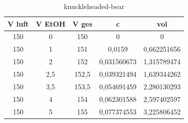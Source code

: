 \begin{table}[htbp]
    \centering
    \caption{knuckleheaded-bear}
    \label{tab:excel}
    \begin{tabular}{ccccc}
        \toprule
        {V luft} & {V EtOH} & {V ges} & {c} & {vol} \\
        \midrule
        150 & 0   & 150   & 0           & 0           \\
        150 & 1   & 151   & 0,0159      & 0,662251656 \\
        150 & 2   & 152   & 0,031560673 & 1,315789474 \\
        150 & 2,5 & 152,5 & 0,039321494 & 1,639344262 \\
        150 & 3,5 & 153,5 & 0,054691459 & 2,280130293 \\
        150 & 4   & 154   & 0,062301588 & 2,597402597 \\
        150 & 5   & 155   & 0,077374553 & 3,225806452 \\
        \bottomrule
    \end{tabular}
\end{table}
